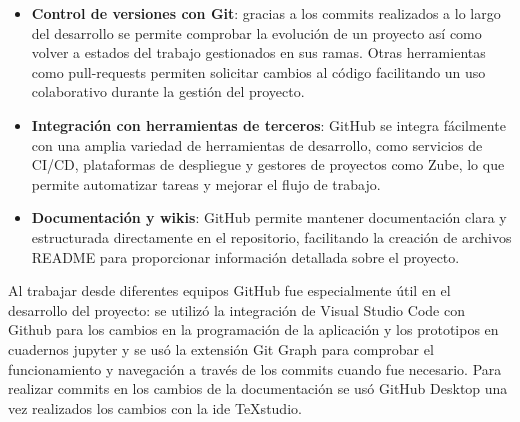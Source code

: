	\begin{itemize}
		
		\item \textbf{Control de versiones con Git}: gracias a los commits realizados a lo largo del desarrollo se permite comprobar la evolución de un proyecto así como volver a estados del trabajo gestionados en sus ramas. Otras herramientas como pull-requests permiten solicitar cambios al código facilitando un uso colaborativo durante la gestión del proyecto.
		
		\item \textbf{Integración con herramientas de terceros}: GitHub se integra fácilmente con una amplia variedad de herramientas de desarrollo, como servicios de CI/CD, plataformas de despliegue y gestores de proyectos como Zube, lo que permite automatizar tareas y mejorar el flujo de trabajo.
		
		\item \textbf{Documentación y wikis}: GitHub permite mantener documentación clara y estructurada directamente en el repositorio, facilitando la creación de archivos README para proporcionar información detallada sobre el proyecto.
		
	\end{itemize}
	Al trabajar desde diferentes equipos GitHub fue especialmente útil en el desarrollo del proyecto: se utilizó la integración de Visual Studio Code con Github para los cambios en la programación de la aplicación y los prototipos en cuadernos jupyter y se usó la extensión Git Graph para comprobar el funcionamiento y navegación a través de los commits cuando fue necesario. Para realizar commits en los cambios de la documentación se usó GitHub Desktop una vez realizados los cambios con la \acrshort{ide} TeXstudio.
	
